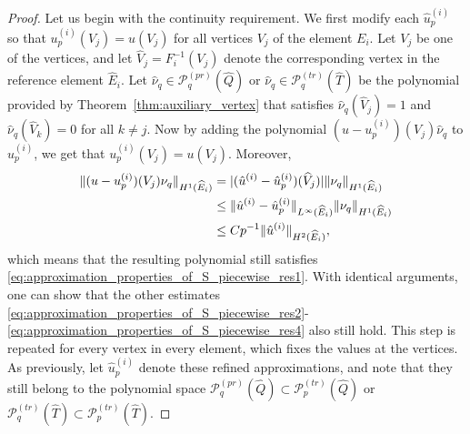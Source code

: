 \documentclass[english, 12pt, a4paper, sci, utf8, a-2b, online]{aaltothesis}
\theoremstyle{definition}
\theoremstyle{plain}
\DeclarePairedDelimiter\abs{\lvert}{\rvert}
\DeclarePairedDelimiter\norm{\lVert}{\rVert}
\numberwithin{equation}{section}
\begin{document}
\begin{proof}
    Let us begin with the continuity requirement.
    We first modify each $\hat{u}_p^{(i)}$ so that $u_p^{(i)}(V_j) = u(V_j)$
    for all vertices $V_j$ of the element $E_i$.
    Let $V_j$ be one of the vertices,
    and let $\widehat{V}_j = F_i^{-1}(V_j)$ denote the 
    corresponding vertex in the reference element $\widehat{E}_i$.
    Let $\hat{\nu}_q \in \mathcal{P}_q^{(pr)}(\widehat{Q})$
    or $\hat{\nu}_q \in \mathcal{P}_q^{(tr)}(\widehat{T})$ be the polynomial
    provided by Theorem~\ref{thm:auxiliary_vertex} that satisfies
    $\hat{\nu}_q(\widehat{V}_j) = 1$
    and $\hat{\nu}_q(\widehat{V}_k) = 0$ for all $k \neq j$.
    Now by adding the polynomial $(u - u_p^{(i)})(V_j) \hat{\nu}_q$
    to $\hat{u}_p^{(i)}$, we get that $u_p^{(i)}(V_j) = u(V_j)$.
    Moreover,
    \begin{align*}
        \norm{(u - u_p^{(i)})(V_j) \nu_q}_{H^1(\widehat{E}_i)}
        &= \abs{(\hat{u}^{(i)} - \hat{u}_p^{(i)})(\widehat{V}_j)} 
            \norm{\nu_q}_{H^1(\widehat{E}_i)} \\
        &\leq \norm{\hat{u}^{(i)} - \hat{u}_p^{(i)}}_{L^{\infty}(\widehat{E}_i)}
            \norm{\nu_q}_{H^1(\widehat{E}_i)} \\
        &\leq C p^{-1} \norm{\hat{u}^{(i)}}_{H^2(\widehat{E}_i)},
    \end{align*}
    which means that the resulting polynomial still satisfies
    \eqref{eq:approximation_properties_of_S_piecewise_res1}.
    With identical arguments, one can show that the other estimates
    \eqref{eq:approximation_properties_of_S_piecewise_res2}-\eqref{eq:approximation_properties_of_S_piecewise_res4}
    also still hold. This step is repeated for every vertex in every element,
    which fixes the values at the vertices.
    As previously, let $\hat{u}_p^{(i)}$ denote these refined approximations,
    and note that they still belong to the polynomial space
    $\mathcal{P}_q^{(pr)}(\widehat{Q}) \subset \mathcal{P}_p^{(tr)}(\widehat{Q})$
    or $\mathcal{P}_q^{(tr)}(\widehat{T}) \subset
    \mathcal{P}_p^{(tr)}(\widehat{T})$.


\end{proof}
\end{document}
